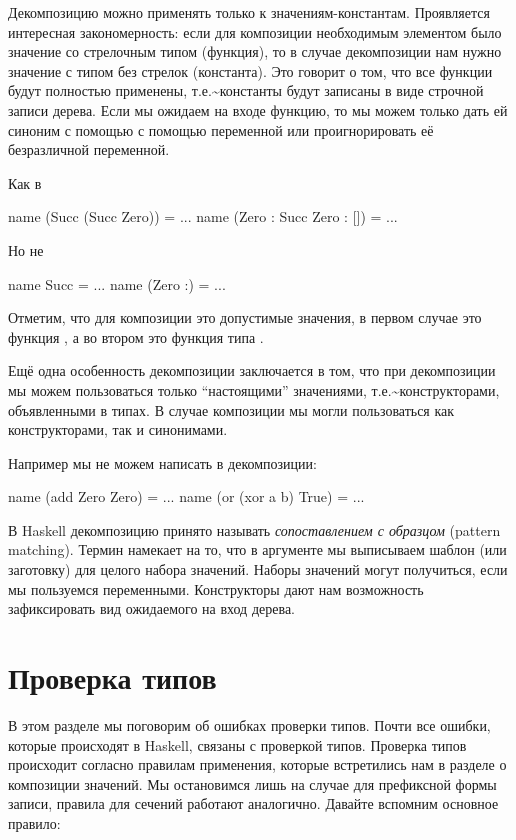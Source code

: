 Декомпозицию можно применять только к значениям-константам. Проявляется
интересная закономерность: если для композиции необходимым элементом
было значение со стрелочным типом (функция), то в случае декомпозиции
нам нужно значение с типом без стрелок (константа). Это говорит о том,
что все функции будут полностью применены,
т.е.\textasciitilde{}константы будут записаны в виде строчной записи
дерева. Если мы ожидаем на входе функцию, то мы можем только дать ей
синоним с помощью с помощью переменной или проигнорировать её
безразличной переменной.

Как в


\begin{code}
name  (Succ (Succ Zero))       = ...
name  (Zero : Succ Zero : [])  = ...
\end{code}

Но не


\begin{code}
name  Succ      = ...
name  (Zero :)  = ...
\end{code}

Отметим, что для композиции это допустимые значения, в первом случае это
функция , а во втором это функция типа
\In{[Nat] -> [Nat]}.

Ещё одна особенность декомпозиции заключается в том, что при
декомпозиции мы можем пользоваться только ``настоящими'' значениями,
т.е.\textasciitilde{}конструкторами, объявленными в типах. В случае
композиции мы могли пользоваться как конструкторами, так и синонимами.

Например мы не можем написать в декомпозиции:


\begin{code}
name  (add Zero Zero)      = ...
name  (or (xor a b) True)  = ...
\end{code}

В Haskell декомпозицию принято называть \emph{сопоставлением с образцом}
(pattern matching). Термин намекает на то, что в аргументе мы выписываем
шаблон (или заготовку) для целого набора значений. Наборы значений могут
получиться, если мы пользуемся переменными. Конструкторы дают нам
возможность зафиксировать вид ожидаемого на вход дерева.

\section{Проверка типов}

В этом разделе мы поговорим об ошибках проверки типов. Почти все ошибки,
которые происходят в Haskell, связаны с проверкой типов. Проверка типов
происходит согласно правилам применения, которые встретились нам в
разделе о композиции значений. Мы остановимся лишь на случае для
префиксной формы записи, правила для сечений работают аналогично.
Давайте вспомним основное правило:



